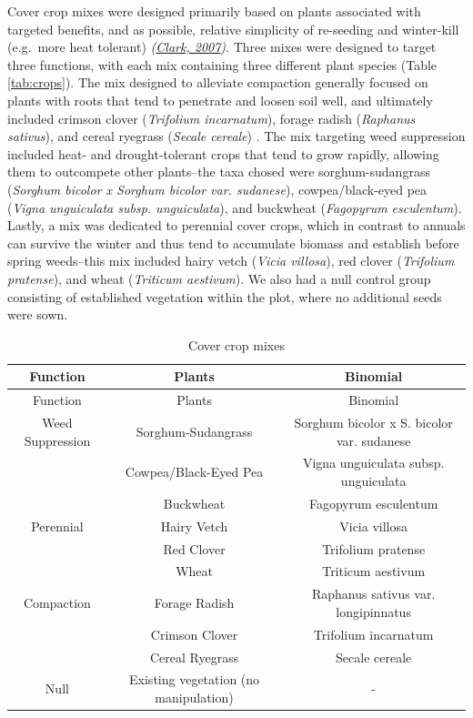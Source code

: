 \documentclass[
  12pt,
]{article}
\begin{document}
Cover crop mixes were designed primarily based on plants associated with targeted benefits, and as possible, relative simplicity of re-seeding and winter-kill (e.g.~more heat tolerant) \emph{(\protect\hyperlink{ref-clark07}{Clark, 2007})}.
Three mixes were designed to target three functions, with each mix containing three different plant species (Table \ref{tab:crops}).
The mix designed to alleviate compaction generally focused on plants with roots that tend to penetrate and loosen soil well, and ultimately included
crimson clover (\emph{Trifolium incarnatum}),
forage radish (\emph{Raphanus sativus}), and
cereal ryegrass (\emph{Secale cereale})
.
The mix targeting weed suppression included heat- and drought-tolerant crops that tend to grow rapidly, allowing them to outcompete other plants--the taxa chosed were
sorghum-sudangrass (\emph{Sorghum bicolor x Sorghum bicolor var. sudanese}),
cowpea/black-eyed pea (\emph{Vigna unguiculata subsp. unguiculata}), and
buckwheat (\emph{Fagopyrum esculentum}).
Lastly, a mix was dedicated to perennial cover crops, which in contrast to annuals can survive the winter and thus tend to accumulate biomass and establish before spring weeds--this mix included
hairy vetch (\emph{Vicia villosa}),
red clover (\emph{Trifolium pratense}), and
wheat (\emph{Triticum aestivum}).
We also had a null control group consisting of established vegetation within the plot, where no additional seeds were sown.

\begin{longtable}[]{@{}ccc@{}}
\caption{\label{tab:setupM}Cover crop mixes}\tabularnewline
\toprule
Function & Plants & Binomial \\
\midrule
\endfirsthead
\toprule
Function & Plants & Binomial \\
\midrule
\endhead
Weed Suppression & Sorghum-Sudangrass & Sorghum bicolor x S. bicolor var. sudanese \\
& Cowpea/Black-Eyed Pea & Vigna unguiculata subsp. unguiculata \\
& Buckwheat & Fagopyrum esculentum \\
Perennial & Hairy Vetch & Vicia villosa \\
& Red Clover & Trifolium pratense \\
& Wheat & Triticum aestivum \\
Compaction & Forage Radish & Raphanus sativus var. longipinnatus \\
& Crimson Clover & Trifolium incarnatum \\
& Cereal Ryegrass & Secale cereale \\
Null & Existing vegetation (no manipulation) & - \\
\bottomrule
\end{longtable}
\end{document}
